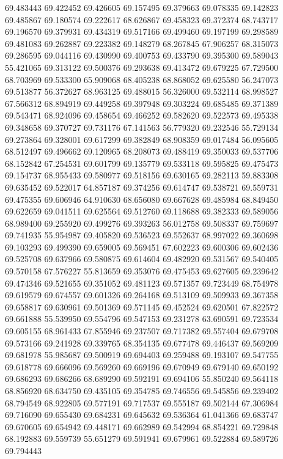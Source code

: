 69.483443
69.422452
69.426605
69.157495
69.379663
69.078335
69.142823
69.485867
69.180574
69.222617
68.626867
69.458323
69.372374
68.743717
69.196570
69.379931
69.434319
69.517166
69.499460
69.197199
69.298589
69.481083
69.262887
69.223382
69.148279
68.267845
67.906257
68.315073
69.286595
69.044116
69.430990
69.400753
69.433790
69.395300
69.589043
55.421065
69.313122
69.500376
69.293638
69.413472
69.679225
67.729500
68.703969
69.533300
65.909068
68.405238
68.868052
69.625580
56.247073
69.513877
56.372627
68.963125
69.488015
56.326000
69.532114
68.998527
67.566312
68.894919
69.449258
69.397948
69.303224
69.685485
69.371389
69.543471
68.924096
69.458654
69.466252
69.582620
69.522573
69.495338
69.348658
69.370727
69.731176
67.141563
56.779320
69.232546
55.729134
69.273864
69.328001
69.617299
69.382849
68.908359
69.017484
56.095605
68.512497
69.496662
69.120965
68.208073
69.488419
69.350033
69.537706
68.152842
67.254531
69.601799
69.135779
69.533118
69.595825
69.475473
69.154737
68.955433
69.580977
69.518156
69.630165
69.282113
59.883308
69.635452
69.522017
64.857187
69.374256
69.614747
69.538721
69.559731
69.475355
69.606946
64.910630
68.656080
69.667628
69.485984
68.849450
69.622659
69.041511
69.625564
69.512760
69.118688
69.382333
69.589056
68.989400
69.255920
69.499276
69.393263
56.012758
69.508337
69.759697
69.741935
55.954987
69.405820
69.536523
69.552637
68.997022
69.360698
69.103293
69.499390
69.659005
69.569451
67.602223
69.600306
69.602436
69.525708
69.637966
69.580875
69.614604
69.482920
69.531567
69.540405
69.570158
67.576227
55.813659
69.353076
69.475453
69.627605
69.239642
69.474346
69.521655
69.351052
69.481123
69.571357
69.723449
68.754978
69.619579
69.674557
69.601326
69.264168
69.513109
69.509933
69.367358
69.658817
69.630961
69.501369
69.571145
69.452524
69.620501
67.822572
69.661888
55.539950
69.554796
69.547153
69.231278
63.690591
69.723534
69.605155
68.961433
67.855946
69.237507
69.717382
69.557404
69.679708
69.573166
69.241928
69.339765
68.354135
69.677478
69.446437
69.569209
69.681978
55.985687
69.500919
69.694403
69.259488
69.193107
69.547755
69.618778
69.666096
69.569260
69.669196
69.670949
69.679140
69.650192
69.686293
69.686266
68.689290
69.592191
69.694106
55.850240
69.564118
68.856920
68.634750
69.435105
69.354785
69.746556
69.545856
69.239402
68.794549
68.922805
69.577191
69.717537
69.555187
69.502144
67.306984
69.716090
69.655430
69.684231
69.645632
69.536364
61.041366
69.683747
69.670605
69.654942
69.448171
69.662989
69.542994
68.854221
69.729848
68.192883
69.559739
55.651279
69.591941
69.679961
69.522884
69.589726
69.794443
